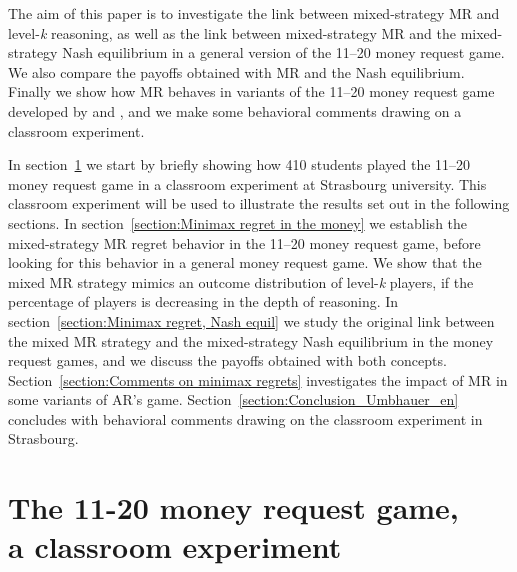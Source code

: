 \begin{Article}
\begin{refsection}[Umbhauer]
The aim of this paper is to investigate the link between mixed-strategy
MR and level-\emph{k} reasoning, as well as the link between
mixed-strategy MR and the mixed-strategy Nash equilibrium in a general
version of the 11--20 money request game. We also compare the payoffs
obtained with MR and the Nash equilibrium. Finally we show how MR
behaves in variants of the 11--20 money request game developed by \textcite{arad2012} and \textcite{goeree2018}, and we make some behavioral
comments drawing on a classroom experiment.

In section~\ref{section:The 11-20 money} we start by briefly showing how 410 students played the 11--20 money request game in a classroom experiment at Strasbourg
university. This classroom experiment will be used to illustrate the
results set out in the following sections. In section~\ref{section:Minimax regret in the money} we establish the mixed-strategy MR regret behavior in the 11--20 money request game, before looking for this behavior in a general money request game. We
show that the mixed MR strategy mimics an outcome distribution of
level-\emph{k} players, if the percentage of players is decreasing in
the depth of reasoning. In section~\ref{section:Minimax regret, Nash equil} we study the original link between the mixed MR strategy and the mixed-strategy Nash equilibrium in the money request games, and we discuss the payoffs obtained with both
concepts. Section~\ref{section:Comments on minimax regrets} investigates the impact of MR in some variants of AR's game. Section~\ref{section:Conclusion_Umbhauer_en} concludes with behavioral comments drawing on the classroom experiment in Strasbourg.


\section[The 11-20 money request game, a classroom experiment]{The 11-20 money request game,\\ a classroom experiment}
\label{section:The 11-20 money}


\end{refsection}
\end{Article}
